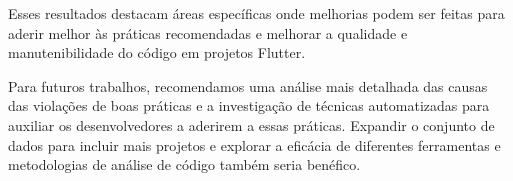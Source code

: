 \documentclass[12pt]{article}
\begin{document}
Esses resultados destacam áreas específicas onde melhorias podem ser feitas para aderir melhor às práticas recomendadas e melhorar a qualidade e manutenibilidade do código em projetos Flutter.

Para futuros trabalhos, recomendamos uma análise mais detalhada das causas das violações de boas práticas e a investigação de técnicas automatizadas para auxiliar os desenvolvedores a aderirem a essas práticas. Expandir o conjunto de dados para incluir mais projetos e explorar a eficácia de diferentes ferramentas e metodologias de análise de código também seria benéfico.





\end{document}
